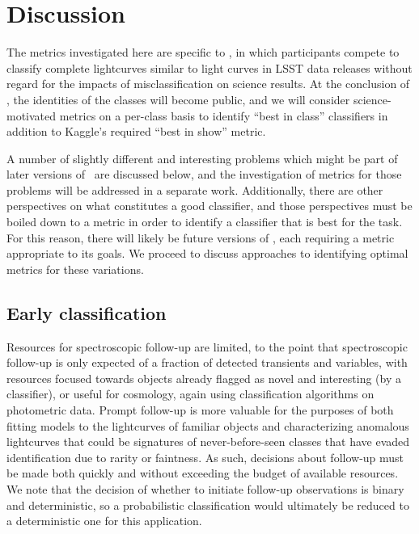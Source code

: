 \section{Discussion}
\label{sec:discussion}

The metrics investigated here are specific to \plasticc, in which participants compete to classify complete lightcurves similar to light curves in LSST data releases without regard for the impacts of misclassification on science results.
At the conclusion of \plasticc, the identities of the classes will become public, and we will consider science-motivated metrics on a per-class basis to identify ``best in class'' classifiers in addition to Kaggle's required ``best in show'' metric.

A number of slightly different and interesting problems which might be part of later versions of \plasticc\ are discussed below, and the investigation of metrics for those problems will be addressed in a separate work.
Additionally, there are other perspectives on what constitutes a good classifier, and those perspectives must be boiled down to a metric in order to identify a classifier that is best for the task.
For this reason, there will likely be future versions of \plasticc, each requiring a metric appropriate to its goals.
We proceed to discuss approaches to identifying optimal metrics for these variations.

\subsection{Early classification}
\label{sec:early}

Resources for spectroscopic follow-up are limited, to the point that spectroscopic follow-up is only expected of a fraction of detected transients and variables, with resources focused towards objects already flagged as novel and interesting (by a classifier), or useful for cosmology, again using classification algorithms on photometric data.
Prompt follow-up is more valuable for the purposes of both fitting models to the lightcurves of familiar objects and characterizing anomalous lightcurves that could be signatures of never-before-seen classes that have evaded identification due to rarity or faintness.
As such, decisions about follow-up must be made both quickly and without exceeding the budget of available resources.
We note that the decision of whether to initiate follow-up observations is binary and deterministic, so a probabilistic classification would ultimately be reduced to a deterministic one for this application.

